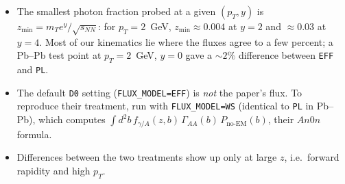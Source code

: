 \documentclass[11pt]{article}
\begin{document}
\begin{itemize}
  \item The smallest photon fraction probed at a given $(p_T,y)$ is
    $z_{\min}=m_T e^{y}/\sqrt{s_{NN}}$: for $p_T=2$~GeV, $z_{\min}\approx0.004$
    at $y=2$ and $\approx0.03$ at $y=4$. Most of our kinematics lie where the
    fluxes agree to a few percent; a Pb--Pb test point at $p_T=2$~GeV, $y=0$
    gave a $\sim2\%$ difference between \texttt{EFF} and \texttt{PL}.
  \item The default \texttt{D0} setting (\texttt{FLUX\_MODEL=EFF}) is
    \emph{not} the paper's flux. To reproduce their treatment, run with
    \texttt{FLUX\_MODEL=WS} (identical to \texttt{PL} in Pb--Pb), which
    computes $\int d^2b\, f_{\gamma/A}(z,b)\,\Gamma_{AA}(b)\,P_{\text{no-EM}}(b)$,
    their $An0n$ formula.
  \item Differences between the two treatments show up only at large $z$,
    i.e.\ forward rapidity and high $p_T$.
\end{itemize}
\end{document}
